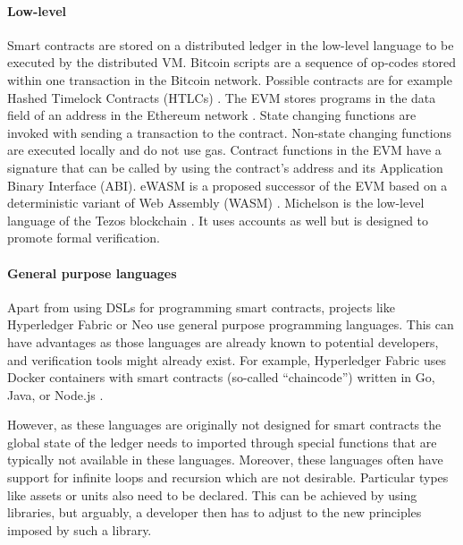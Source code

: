 \paragraph{Low-level}
Smart contracts are stored on a distributed ledger in the low-level language to be executed by the distributed VM.
Bitcoin scripts are a sequence of op-codes stored within one transaction in the Bitcoin network\cite{BitcoinWiki2018Script}. 
Possible contracts are for example Hashed Timelock Contracts (HTLCs) \cite{BitcoinWiki2018HTLC}.
The EVM stores programs in the data field of an address in the Ethereum network \cite{Wood2014}. State changing functions are invoked with sending a transaction to the contract. Non-state changing functions are executed locally and do not use gas. Contract functions in the EVM have a signature that can be called by using the contract's address and its Application Binary Interface (ABI).
eWASM is a proposed successor of the EVM based on a deterministic variant of Web Assembly (WASM) \cite{Wanderer2015,EthereumFoundation2018ewasm}.
Michelson is the low-level language of the Tezos blockchain \cite{DynamicLedgerSolutions2017}. It uses accounts as well but is designed to promote formal verification.

\paragraph{General purpose languages}
Apart from using DSLs for programming smart contracts, projects like Hyperledger Fabric or Neo use general purpose programming languages.
This can have advantages as those languages are already known to potential developers, and verification tools might already exist.
For example, Hyperledger Fabric uses Docker containers with smart contracts (so-called ``chaincode'') written in Go, Java, or Node.js \cite{Cachin2016}. 

However, as these languages are originally not designed for smart contracts the global state of the ledger needs to imported through special functions that are typically not available in these languages.
Moreover, these languages often have support for infinite loops and recursion which are not desirable.
Particular types like assets or units also need to be declared. 
This can be achieved by using libraries, but arguably, a developer then has to adjust to the new principles imposed by such a library.

